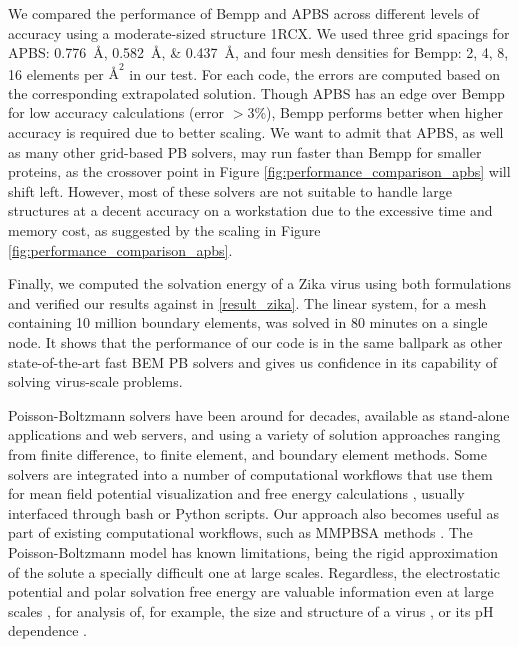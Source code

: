 We compared the performance of Bempp and APBS across different levels of accuracy using a moderate-sized structure 1RCX.
We used three grid spacings for APBS: \qtylist{0.776;0.582;0.437}{\angstrom}, and four mesh densities for Bempp: 2, 4, 8, 16 elements per $\si{\angstrom}^{2}$ in our test.
For each code, the errors are computed based on the corresponding extrapolated solution.
Though APBS has an edge over Bempp for low accuracy calculations (error $>3\%$), Bempp performs better when higher accuracy is required due to better scaling.
We want to admit that APBS, as well as many other grid-based PB solvers, may run faster than Bempp for smaller proteins, as the crossover point in Figure \ref{fig:performance_comparison_apbs} will shift left.
However, most of these solvers are not suitable to handle large structures at a decent accuracy on a workstation due to the excessive time and memory cost, as suggested by the scaling in Figure \ref{fig:performance_comparison_apbs}.

Finally, we computed the solvation energy of a Zika virus using both formulations and verified our results against \pygbe in \ref{result_zika}.
The linear system, for a mesh containing 10 million boundary elements, was solved in 80 minutes on a single node.
It shows that the performance of our code is in the same ballpark as other state-of-the-art fast BEM PB solvers \cite{GengKrasny2013,ZhangPengHuangPitsianisSunLu2015,CooperBardhanBarba2014} and gives us confidence in its capability of solving virus-scale problems.

Poisson-Boltzmann solvers have been around for decades, available as stand-alone applications and web servers, and using a variety of solution approaches \cite{JurrusETal2018} ranging from finite difference, to finite element, and boundary element methods.
Some solvers are integrated into a number of computational workflows that use them for mean field potential visualization \cite{HumphreyETal1996} and free energy calculations \cite{MillerETal2012,KumariETal2014}, usually interfaced through bash or Python scripts.
Our approach also becomes useful as part of existing computational workflows, such as MMPBSA methods \cite{WangETal2018}.
The Poisson-Boltzmann model has known limitations, being the rigid approximation of the solute a specially difficult one at large scales. 
Regardless, the electrostatic potential and polar solvation free energy are valuable information even at large scales \cite{LiETal2019}, for analysis of, for example, the size and structure of a virus \cite{SiberETal2012}, or its pH dependence \cite{RoshalETal2019}. 

